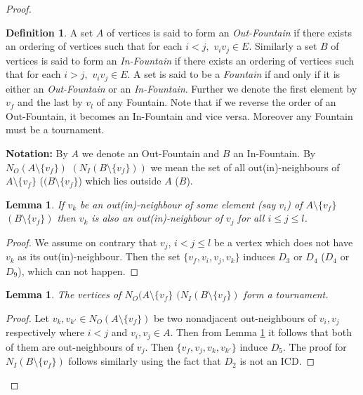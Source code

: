 \documentclass{article}
\newtheorem{lem}[thm]{Lemma}
\theoremstyle{definition}
\newtheorem{defn}[thm]{Definition}
\numberwithin{equation}{section}
\begin{document}
\begin{proof}
\begin{defn}\label{outin}
A set $A$ of vertices is said to form an {\em Out-Fountain} if there exists an ordering of vertices such that for each $i< j,$ $v_{i}v_{j}\in E$. Similarly
a set $B$ of vertices is said to form an {\em In-Fountain} if there exists an ordering of vertices such that for each $i> j,$ $v_{i}v_{j}\in E$. A set is said to be a {\em Fountain} if and only if it is either an {\em Out-Fountain} or an {\em In-Fountain}. Further we denote the first element by $v_{f}$ and the last by $v_{l}$ of any Fountain. Note that if we reverse the order of an Out-Fountain, it becomes an In-Fountain and vice versa. Moreover any Fountain must be a tournament. 
\end{defn}
\vspace{0.1em}

\noindent\textbf{Notation:} By $A$ we denote an Out-Fountain and $B$ an In-Fountain.  By $N_{O}(A\setminus \{v_{f}\})$ $(N_{I}(B\setminus\{v_{f}\}))$ we mean the set of all out(in)-neighbours of $A\setminus \{v_f\}$ ($(B\setminus \{v_{f}\}$) which lies outside $A$ ($B$).


\begin{lem}\label{lme3}
If $v_{k}$ be an out(in)-neighbour of some element (say $v_{i}$) of $A\setminus\{v_{f}\}$ $(B\setminus\{v_{f}\})$ then $v_{k}$ is also an out(in)-neighbour of 
$v_{j}$ for all $i\leq j\leq l$.
\end{lem}

\begin{proof}
We assume on contrary that $v_{j}$, $i<j\leq l$ be a vertex which does not have $v_{k}$ as its out(in)-neighbour. Then the set $\{v_{f},v_{i},v_{j},v_{k}\}$ induces $D_{3}$ or $D_{4}$ ($D_{4}$ or $D_{9}$), which can not happen.
\end{proof}


\begin{lem}\label{lme4}
The vertices of $N_{O}(A\setminus \{v_{f}\}$ $(N_{I}(B\setminus \{v_{f}\})$ form a tournament.
\end{lem}

\begin{proof}
 Let $v_{k},v_{k'}\in N_{O}(A\setminus \{v_{f}\})$ be two nonadjacent out-neighbours of $v_{i},v_{j}$ respectively where $i<j$ and $v_{i},v_{j}\in A$. Then from Lemma \ref{lme3} it follows that both of them are out-neighbours of $v_{j}.$ Then $\{v_{f},v_{j},v_{k},v_{k'}\}$ induce $D_{5}.$ The proof for $N_{I}(B\setminus \{v_{f}\})$ follows similarly using the fact that $D_{2}$ is not an ICD.
\end{proof}


\end{proof}
\end{document}
